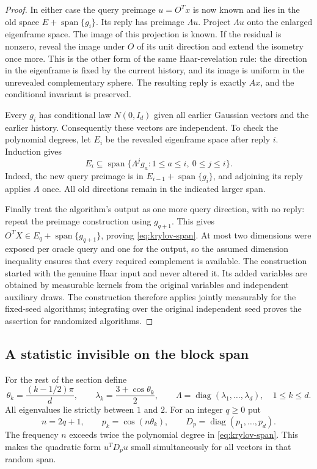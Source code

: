 \begin{proof}
In either case the query preimage $u=O^Tx$ is now known and lies in the
old space $E+\operatorname{span}\{g_i\}$. Its reply has preimage
$\Lambda u$. Project $\Lambda u$ onto the enlarged eigenframe space.
The image of this projection is known. If the residual is nonzero,
reveal the image under $O$ of its unit direction and extend the
isometry once more. This is the other form of the same Haar-revelation
rule: the direction in the eigenframe is fixed by the current history,
and its image is uniform in the unrevealed complementary sphere. The
resulting reply is exactly $Ax$, and the conditional invariant is
preserved.

Every $g_i$ has conditional law $N(0,I_d)$ given all earlier Gaussian
vectors and the earlier history. Consequently these vectors are
independent. To check the polynomial degrees, let $E_i$ be the revealed
eigenframe space after reply $i$. Induction gives
\[
 E_i\subseteq\operatorname{span}
 \{\Lambda^j g_a:1\le a\le i,\ 0\le j\le i\}.
\]
Indeed, the new query preimage is in $E_{i-1}+\operatorname{span}\{g_i\}$,
and adjoining its reply applies $\Lambda$ once. All old directions
remain in the indicated larger span.

Finally treat the algorithm's output as one more query direction, with
no reply: repeat the preimage construction using $g_{q+1}$. This gives
$O^TX\in E_q+\operatorname{span}\{g_{q+1}\}$, proving
\eqref{eq:krylov-span}. At most two dimensions were exposed per oracle
query and one for the output, so the assumed dimension inequality
ensures that every required complement is available. The construction
started with the genuine Haar input and never altered it. Its added
variables are obtained by measurable kernels from the original variables
and independent auxiliary draws. The construction therefore applies
jointly measurably for the fixed-seed algorithms; integrating over the
original independent seed proves the assertion for randomized algorithms.
\end{proof}

\subsection{A statistic invisible on the block span}

For the rest of the section define
\begin{equation}\label{eq:lower-spectrum}
 \theta_k=\frac{(k-1/2)\pi}{d},\qquad
 \lambda_k=\frac{3+\cos\theta_k}{2},\qquad
 \Lambda=\operatorname{diag}(\lambda_1,\ldots,\lambda_d),
 \quad 1\le k\le d.
\end{equation}
All eigenvalues lie strictly between $1$ and $2$. For an integer $q\ge0$
put
\[
 n=2q+1,\qquad p_k=\cos(n\theta_k),\qquad
 D_p=\operatorname{diag}(p_1,\ldots,p_d).
\]
The frequency $n$ exceeds twice the polynomial degree in
\eqref{eq:krylov-span}. This makes the quadratic form $u^TD_pu$ small
simultaneously for all vectors in that random span.

